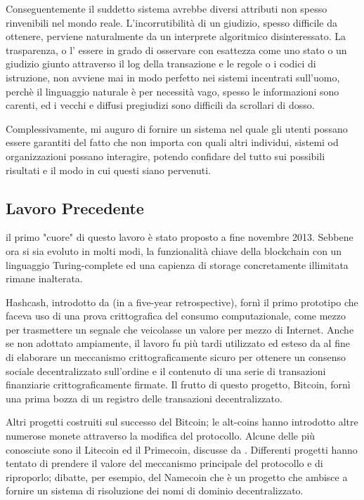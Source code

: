 \documentclass[9pt,oneside]{amsart}
\begin{document}
\begin{multicols}{2}
Conseguentemente il suddetto sistema avrebbe diversi attributi non spesso rinvenibili nel mondo reale. L'incorrutibilità di un giudizio, spesso difficile da ottenere, perviene naturalmente da un interprete algoritmico disinteressato. La trasparenza, o l' essere in grado di osservare con esattezza come uno stato o un giudizio giunto attraverso il log della transazione e le regole o i codici di istruzione, non avviene mai in modo perfetto nei sistemi incentrati sull'uomo, perchè il linguaggio naturale è per necessità vago, spesso le informazioni sono carenti, ed i vecchi e diffusi pregiudizi sono difficili da scrollari di dosso.

Complessivamente, mi auguro di fornire un sistema nel quale gli utenti possano essere garantiti del fatto che non importa con quali altri individui, sistemi od organizzazioni possano interagire, potendo confidare del tutto sui possibili risultati e il modo in cui questi siano pervenuti.

\subsection{Lavoro Precedente} \label{ch:previous}

\cite{buterin2013ethereum} il primo "cuore" di questo lavoro è stato proposto a fine novembre 2013. Sebbene ora si sia evoluto in molti modi, la funzionalità chiave della blockchain con un linguaggio Turing-complete ed una capienza di storage concretamente illimitata rimane inalterata.

Hashcash, introdotto da \cite{back2002hashcash} (in a five-year retrospective), fornì il primo prototipo che faceva uso di una prova crittografica del consumo computazionale, come mezzo per  trasmettere un segnale che veicolasse un valore per mezzo di Internet. Anche se non adottato ampiamente, il lavoro fu più tardi utilizzato ed esteso da \cite{nakamoto2008bitcoin} al fine di elaborare un meccanismo crittograficamente sicuro per ottenere un consenso sociale decentralizzato sull'ordine e il contenuto di una serie di transazioni finanziarie crittograficamente firmate. Il frutto di questo progetto, Bitcoin, fornì una prima bozza di un registro delle transazioni decentralizzato.

Altri progetti costruiti sul successo del Bitcoin; le alt-coins hanno introdotto altre numerose monete attraverso la modifica del protocollo. Alcune delle più conosciute sono il Litecoin ed il Primecoin, discusse da \cite{sprankel2013technical}. Differenti progetti hanno tentato di prendere il valore del meccanismo principale del protocollo e di riproporlo; \cite{aron2012bitcoin} dibatte, per esempio, del Namecoin che è un progetto che ambisce a fornire un sistema di risoluzione dei nomi di dominio decentralizzato.


\end{multicols}
\end{document}
